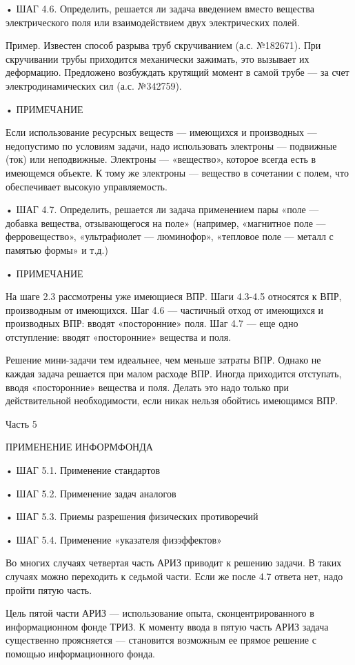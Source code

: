 • ШАГ  4.6. Определить, решается  ли задача введением  вместо вещества
электрического поля или взаимодействием двух электрических полей.

Пример. Известен способ разрыва  труб скручиванием (а.с. №182671). При
скручивании  трубы приходится  механически зажимать,  это вызывает  их
деформацию. Предложено возбуждать  крутящий момент в самой  трубе — за
счет электродинамических сил (а.с. №342759).

• ПРИМЕЧАНИЕ

Если  использование  ресурсных  веществ   —  имеющихся  и  производных
—  недопустимо  по  условиям  задачи, надо  использовать  электроны  —
подвижные  (ток)  или  неподвижные. Электроны  —  «вещество»,  которое
всегда есть  в имеющемся  объекте. К  тому же  электроны —  вещество в
сочетании с полем, что обеспечивает высокую управляемость.


• ШАГ  4.7. Определить,  решается ли задача  применением пары  «поле —
добавка вещества, отзывающегося на  поле» (например, «магнитное поле —
ферровещество», «ультрафиолет — люминофор»,  «тепловое поле — металл с
памятью формы» и т.д.)

• ПРИМЕЧАНИЕ

На шаге  2.3 рассмотрены уже  имеющиеся ВПР. Шаги 4.3-4.5  относятся к
ВПР, производным от имеющихся. Шаг  4.6 — частичный отход от имеющихся
и  производных ВПР:  вводят «посторонние»  поля.  Шаг 4.7  — еще  одно
отступление: вводят «посторонние» вещества и поля.


Решение мини-задачи тем  идеальнее, чем меньше затраты  ВПР. Однако не
каждая  задача  решается  при  малом расходе  ВПР.  Иногда  приходится
отступать, вводя «посторонние» вещества и поля. Делать это надо только
при действительной необходимости, если никак нельзя обойтись имеющимся
ВПР.


Часть 5

ПРИМЕНЕНИЕ ИНФОРМФОНДА

• ШАГ 5.1. Применение стандартов

• ШАГ 5.2. Применение задач аналогов

• ШАГ 5.3. Приемы разрешения физических противоречий

• ШАГ 5.4. Применение «указателя физэффектов»


Во многих  случаях четвертая часть  АРИЗ приводит к решению  задачи. В
таких  случаях можно  переходить к  седьмой части.  Если же  после 4.7
ответа нет, надо пройти пятую часть.

Цель  пятой части  АРИЗ —  использование опыта,  сконцентрированного в
информационном фонде ТРИЗ.  К моменту ввода в пятую  часть АРИЗ задача
существенно  проясняется —  становится возможным  ее прямое  решение с
помощью информационного фонда.


